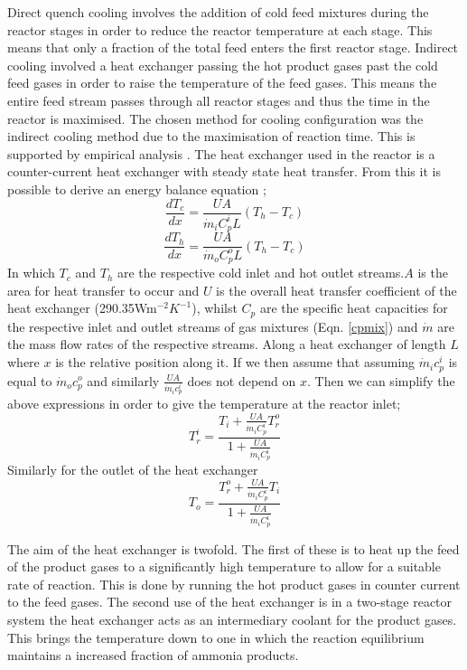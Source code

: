 {
Direct quench cooling involves the addition of cold feed mixtures during the reactor stages in order to reduce the reactor temperature at each stage. This means that only a fraction of the total feed enters the first reactor stage.
Indirect cooling involved a heat exchanger passing the hot product gases past the cold feed gases in order to raise the temperature of the feed gases. This means the entire feed stream passes through all reactor stages and thus the time in the reactor is maximised.
The chosen method for cooling configuration was the indirect cooling method due to the maximisation of reaction time. This is supported by empirical analysis \cite{Penkuhn2017}. The heat exchanger used in the reactor is a counter-current heat exchanger with steady state heat transfer. From this it is possible to derive an energy balance equation \cite{Jinasena2016};
\begin{equation}
\frac{dT_c}{dx}=\frac{UA}{\dot m_i C^i_pL}(T_h-T_c)  
\end{equation}
\begin{equation}
\frac{dT_h}{dx}=\frac{UA}{\dot m_o C^o_pL}(T_h-T_c)
\end{equation}
In which $T_c$ and $T_h$ are the respective cold inlet and hot outlet streams.$A$ is the area for heat transfer to occur and $U$ is the overall heat transfer coefficient of the heat exchanger (290.35Wm$^{-2}K^{-1}$)\cite{Elnashaie1988}, whilst $C_p$ are the specific heat capacities for the respective inlet and outlet streams of gas mixtures (Eqn. \ref{cpmix}) and $\dot m$ are the mass flow rates of the respective streams. Along a heat exchanger of length $L$ where $x$ is the relative position along it. If we then assume that assuming $\dot m_i c^i_p$ is equal to $\dot m_o c^o_p$ and similarly $\frac{UA}{\dot m_i c^i_p}$ does not depend on $x$. Then we can simplify the above expressions in order to give the temperature at the reactor inlet;
\begin{equation}
T_r^i = \frac{T_i + \frac{UA}{\dot m_i C^i_p}T_r^o}{1+\frac{UA}{\dot m_i C^i_p}}
\end{equation}
Similarly for the outlet of the heat exchanger
\begin{equation}
T_o = \frac{T_r^o + \frac{UA}{\dot m_i C^i_p}T_i}{1+\frac{UA}{\dot m_i C^i_p}}
\end{equation}

The aim of the heat exchanger is twofold. The first of these is to heat up the feed of the product gases to a significantly high temperature to allow for a suitable rate of reaction. This is done by running the hot product gases in counter current to the feed gases. The second use of the heat exchanger is in a two-stage reactor system the heat exchanger acts as an intermediary coolant for the product gases. This brings the temperature down to one in which the reaction equilibrium maintains a increased fraction of ammonia products.

}
